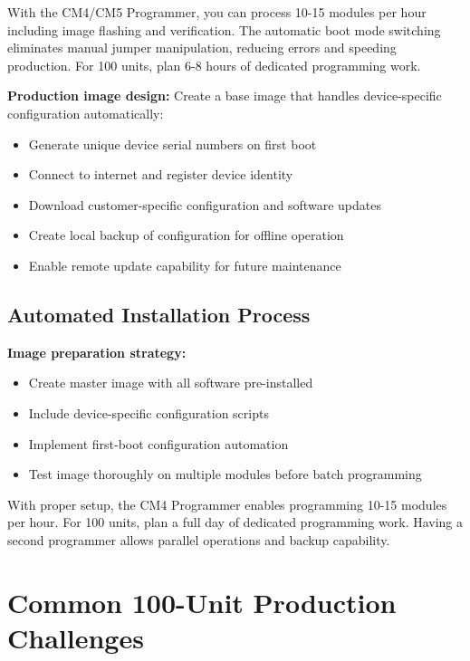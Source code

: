 \begin{tcolorbox}[colback=blue!10,colframe=blue!75!black,title=Programming Efficiency]
With the CM4/CM5 Programmer, you can process 10-15 modules per hour including image flashing and verification. The automatic boot mode switching eliminates manual jumper manipulation, reducing errors and speeding production. For 100 units, plan 6-8 hours of dedicated programming work.
\end{tcolorbox}

\textbf{Production image design:}
Create a base image that handles device-specific configuration automatically:
\begin{itemize}
\item Generate unique device serial numbers on first boot
\item Connect to internet and register device identity
\item Download customer-specific configuration and software updates
\item Create local backup of configuration for offline operation
\item Enable remote update capability for future maintenance
\end{itemize}

\subsection{Automated Installation Process}

\textbf{Image preparation strategy:}
\begin{itemize}
\item Create master image with all software pre-installed
\item Include device-specific configuration scripts
\item Implement first-boot configuration automation
\item Test image thoroughly on multiple modules before batch programming
\end{itemize}

\begin{tcolorbox}[colback=blue!10,colframe=blue!75!black,title=Programming Efficiency]
With proper setup, the CM4 Programmer enables programming 10-15 modules per hour. For 100 units, plan a full day of dedicated programming work. Having a second programmer allows parallel operations and backup capability.
\end{tcolorbox}

\section{Common 100-Unit Production Challenges}

